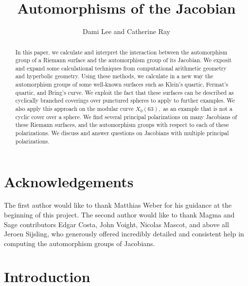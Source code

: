\documentclass[12pt,reqno]{amsart}
\title{Automorphisms of the Jacobian}
\author{Dami Lee and Catherine Ray}
\theoremstyle{definition}
\theoremstyle{remark}
\begin{document}
	
	\maketitle
	
\begin{abstract}
In this paper, we calculate and interpret the interaction between the automorphism group of a Riemann surface and the automorphism group of its Jacobian. We exposit and expand some calculational techniques from computational arithmetic geometry and hyperbolic geometry. Using these methods, we calculate in a new way the automorphism groups of some well-known surfaces such as Klein's quartic, Fermat's quartic, and Bring's curve. We exploit the fact that these surfaces can be described as cyclically branched coverings over punctured spheres to apply to further examples. We also apply this approach on the modular curve $X_0(63),$ as an example that is not a cyclic cover over a sphere. We find several principal polarizations on many Jacobians of these Riemann surfaces, and the automorphism groups with respect to each of these polarizations. We discuss and answer questions on Jacobians with multiple principal polarizations. 
\end{abstract} 
	
	
\tableofcontents




\section*{Acknowledgements} 
The first author would like to thank Matthias Weber for his guidance at the beginning of this project. The second author would like to thank Magma and Sage contributors Edgar Costa, John Voight, Nicolas Mascot, and above all Jeroen Sijsling, who generously offered incredibly detailed and consistent help in computing the automorphism groups of Jacobians.

\section{Introduction} 

\end{document}
